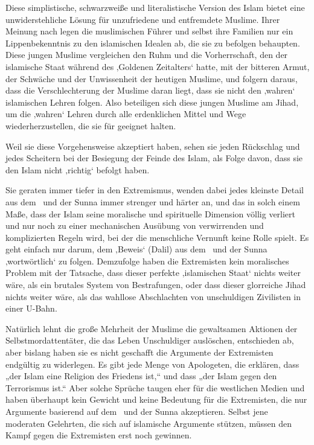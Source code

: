 \documentclass[12pt]{memoir}
\begin{document}
Diese simplistische, schwarzweiße und literalistische Version des Islam
bietet eine unwiderstehliche Lösung für unzufriedene und entfremdete Muslime.
Ihrer Meinung nach legen die muslimischen Führer und selbst ihre Familien
nur ein Lippenbekenntnis zu den islamischen Idealen ab,
die sie zu befolgen behaupten.
Diese jungen Muslime vergleichen den Ruhm und die Vorherrschaft,
den der islamische Staat während des ‚Goldenen Zeitalters‘ hatte,
mit der bitteren Armut, der Schwäche und der Unwissenheit der heutigen Muslime,
und folgern daraus, dass die Verschlechterung der Muslime daran liegt,
dass sie nicht den ‚wahren‘ islamischen Lehren folgen.
Also beteiligen sich diese jungen Muslime am Jihad,
um die ‚wahren‘ Lehren durch alle erdenklichen Mittel
und Wege wiederherzustellen, die sie für geeignet halten.

Weil sie diese Vorgehensweise akzeptiert haben,
sehen sie jeden Rückschlag und jedes Scheitern
bei der Besiegung der Feinde des Islam,
als Folge davon, dass sie den Islam nicht ‚richtig‘ befolgt haben.

Sie geraten immer tiefer in den Extremismus,
wenden dabei jedes kleinste Detail aus dem \Quran\
und der Sunna immer strenger und härter an, und das in solch einem Maße,
dass der Islam seine moralische und spirituelle Dimension völlig verliert
und nur noch zu einer mechanischen Ausübung
von verwirrenden und komplizierten Regeln wird,
bei der die menschliche Vernunft keine Rolle spielt.
Es geht einfach nur darum, dem ‚Beweis‘ (Dalil)
aus dem \Quran\ und der Sunna ‚wortwörtlich‘ zu folgen.
Demzufolge haben die Extremisten kein moralisches Problem mit der Tatsache,
dass dieser perfekte ‚islamischen Staat‘ nichts weiter wäre,
als ein brutales System von Bestrafungen,
oder dass dieser glorreiche Jihad nichts weiter wäre,
als das wahllose Abschlachten von unschuldigen Zivilisten in einer U-Bahn.

Natürlich lehnt die große Mehrheit der Muslime
die gewaltsamen Aktionen der Selbstmordattentäter,
die das Leben Unschuldiger auslöschen, entschieden ab,
aber bislang haben sie es nicht geschafft
die Argumente der Extremisten endgültig zu widerlegen.
Es gibt jede Menge von Apologeten, die erklären,
dass „der Islam eine Religion des Friedens ist,“
und dass „der Islam gegen den Terrorismus ist.“
Aber solche Sprüche taugen eher für die westlichen Medien
und haben überhaupt kein Gewicht und keine Bedeutung für die Extremisten,
die nur Argumente basierend auf dem \Quran\ und der Sunna akzeptieren.
Selbst jene moderaten Gelehrten, die sich auf islamische Argumente stützen,
müssen den Kampf gegen die Extremisten erst noch gewinnen.
\end{document}
